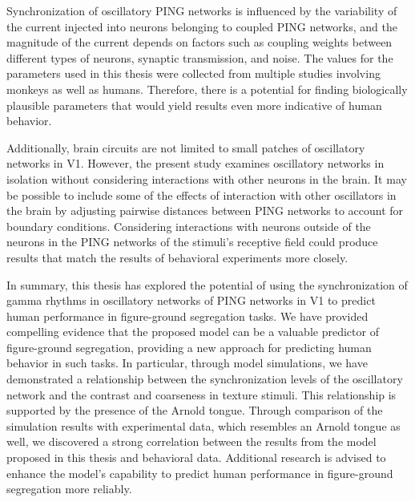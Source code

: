 Synchronization of oscillatory PING networks is influenced by the variability of the current injected into neurons belonging to coupled PING networks, and the magnitude of the current depends on factors such as coupling weights between different types of neurons, synaptic transmission, and noise. The values for the parameters used in this thesis were collected from multiple studies involving monkeys as well as humans. Therefore, there is a potential for finding biologically plausible parameters that would yield results even more indicative of human behavior.

Additionally, brain circuits are not limited to small patches of oscillatory networks in V1. However, the present study examines oscillatory networks in isolation without considering interactions with other neurons in the brain. It may be possible to include some of the effects of interaction with other oscillators in the brain by adjusting pairwise distances between PING networks to account for boundary conditions. Considering interactions with neurons outside of the neurons in the PING networks of the stimuli's receptive field could produce results that match the results of behavioral experiments more closely.

In summary, this thesis has explored the potential of using the synchronization of gamma rhythms in oscillatory networks of PING networks in V1 to predict human performance in figure-ground segregation tasks. We have provided compelling evidence that the proposed model can be a valuable predictor of figure-ground segregation, providing a new approach for predicting human behavior in such tasks. In particular, through model simulations, we have demonstrated a relationship between the synchronization levels of the oscillatory network and the contrast and coarseness in texture stimuli. This relationship is supported by the presence of the Arnold tongue. Through comparison of the simulation results with experimental data, which resembles an Arnold tongue as well, we discovered a strong correlation between the results from the model proposed in this thesis and behavioral data. Additional research is advised to enhance the model's capability to predict human performance in figure-ground segregation more reliably.